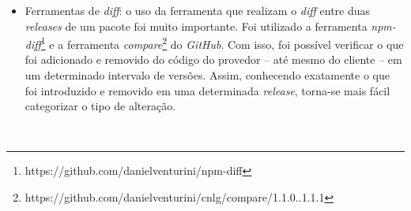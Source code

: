 \begin{itemize}
    \item Ferramentas de \textit{diff}: o uso da ferramenta que realizam o  \textit{diff} entre duas \textit{releases} de um pacote foi muito importante. Foi utilizado a ferramenta \textit{npm-diff}\footnote{https://github.com/danielventurini/npm-diff} e a ferramenta \textit{compare}\footnote{https://github.com/danielventurini/cnlg/compare/1.1.0..1.1.1} do \textit{GitHub}. Com isso, foi possível verificar o que foi adicionado e removido do código do provedor -- até mesmo do cliente -- em um determinado intervalo de versões. Assim, conhecendo exatamente o que foi introduzido e removido em uma determinada \textit{release}, torna-se mais fácil categorizar o tipo de alteração.
\end{itemize}

\begin {figure} [h!]
   \centering
   \mbox {
        \quad
}
\end{figure}
